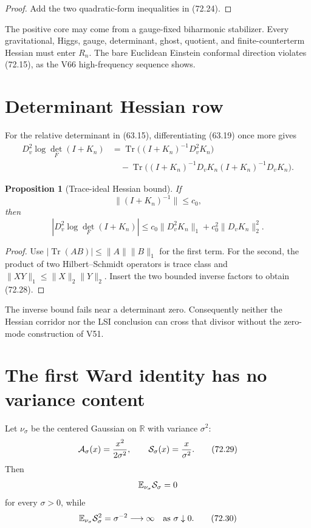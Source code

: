 \documentclass[11pt]{article}
\newtheorem{proposition}[theorem]{Proposition}
\theoremstyle{remark}
\begin{document}
\begin{proof}
Add the two quadratic-form inequalities in (72.24).
\end{proof}

The positive core may come from a gauge-fixed biharmonic
stabilizer.  Every gravitational, Higgs, gauge, determinant, ghost,
quotient, and finite-counterterm Hessian must enter \(R_n\).
The bare Euclidean Einstein conformal direction violates (72.15),
as the V66 high-frequency sequence shows.

\section{Determinant Hessian row}

For the relative determinant in (63.15), differentiating (63.19)
once more gives
\[
\begin{split}
 D_v^2\log\det_{\!F}(I+K_n)
 &=
 \operatorname{Tr}\bigl((I+K_n)^{-1}D_v^2K_n\bigr)\\
 &\quad-
 \operatorname{Tr}\bigl(
 (I+K_n)^{-1}D_vK_n
 (I+K_n)^{-1}D_vK_n
 \bigr).                                              \tag{72.26}
\end{split}
\]

\begin{proposition}[Trace-ideal Hessian bound]
\label{prop:v15v72-det-hessian}
If
\[
 \|(I+K_n)^{-1}\|\leq c_0,                            \tag{72.27}
\]
then
\[
 \left|D_v^2\log\det_{\!F}(I+K_n)\right|
 \leq
 c_0\|D_v^2K_n\|_1+
 c_0^2\|D_vK_n\|_2^2.                                \tag{72.28}
\]
\end{proposition}

\begin{proof}
Use
\(|\operatorname{Tr}(AB)|\leq\|A\|\|B\|_1\)
for the first term.  For the second, the product of two
Hilbert--Schmidt operators is trace class and
\(\|XY\|_1\leq\|X\|_2\|Y\|_2\).  Insert the two bounded inverse
factors to obtain (72.28).
\end{proof}

The inverse bound fails near a determinant zero.  Consequently
neither the Hessian corridor nor the LSI conclusion can cross that
divisor without the zero-mode construction of V51.

\section{The first Ward identity has no variance content}

\begin{counterexample}
\label{cnt:v15v72-centered}
Let \(\nu_\sigma\) be the centered Gaussian on \(\mathbb R\) with
variance \(\sigma^2\):
\[
 {\cal A}_\sigma(x)=\frac{x^2}{2\sigma^2},\qquad
 {\cal S}_\sigma(x)=\frac{x}{\sigma^2}.                \tag{72.29}
\]
Then
\[
 \mathbb E_{\nu_\sigma}{\cal S}_\sigma=0
\]
for every \(\sigma>0\), while
\[
 \mathbb E_{\nu_\sigma}{\cal S}_\sigma^2
 =\sigma^{-2}\longrightarrow\infty
 \quad\hbox{as }\sigma\downarrow0.                    \tag{72.30}
\]
\end{counterexample}
\end{document}

